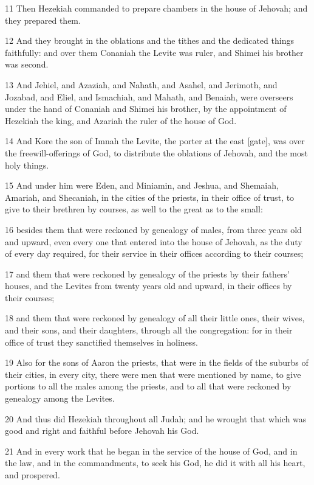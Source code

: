 \par 11 Then Hezekiah commanded to prepare chambers in the house of Jehovah; and they prepared them.
\par 12 And they brought in the oblations and the tithes and the dedicated things faithfully: and over them Conaniah the Levite was ruler, and Shimei his brother was second.
\par 13 And Jehiel, and Azaziah, and Nahath, and Asahel, and Jerimoth, and Jozabad, and Eliel, and Ismachiah, and Mahath, and Benaiah, were overseers under the hand of Conaniah and Shimei his brother, by the appointment of Hezekiah the king, and Azariah the ruler of the house of God.
\par 14 And Kore the son of Imnah the Levite, the porter at the east [gate], was over the freewill-offerings of God, to distribute the oblations of Jehovah, and the most holy things.
\par 15 And under him were Eden, and Miniamin, and Jeshua, and Shemaiah, Amariah, and Shecaniah, in the cities of the priests, in their office of trust, to give to their brethren by courses, as well to the great as to the small:
\par 16 besides them that were reckoned by genealogy of males, from three years old and upward, even every one that entered into the house of Jehovah, as the duty of every day required, for their service in their offices according to their courses;
\par 17 and them that were reckoned by genealogy of the priests by their fathers' houses, and the Levites from twenty years old and upward, in their offices by their courses;
\par 18 and them that were reckoned by genealogy of all their little ones, their wives, and their sons, and their daughters, through all the congregation: for in their office of trust they sanctified themselves in holiness.
\par 19 Also for the sons of Aaron the priests, that were in the fields of the suburbs of their cities, in every city, there were men that were mentioned by name, to give portions to all the males among the priests, and to all that were reckoned by genealogy among the Levites.
\par 20 And thus did Hezekiah throughout all Judah; and he wrought that which was good and right and faithful before Jehovah his God.
\par 21 And in every work that he began in the service of the house of God, and in the law, and in the commandments, to seek his God, he did it with all his heart, and prospered.

